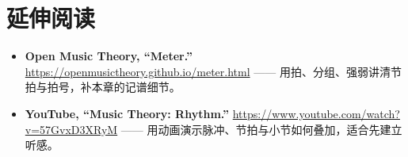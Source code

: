 \section*{延伸阅读}
\begin{itemize}
  \item \textbf{Open Music Theory, “Meter.”} \url{https://openmusictheory.github.io/meter.html} —— 用拍、分组、强弱讲清节拍与拍号，补本章的记谱细节。
  \item \textbf{YouTube, “Music Theory: Rhythm.”} \url{https://www.youtube.com/watch?v=57GvxD3XRyM} —— 用动画演示脉冲、节拍与小节如何叠加，适合先建立听感。
\end{itemize}

